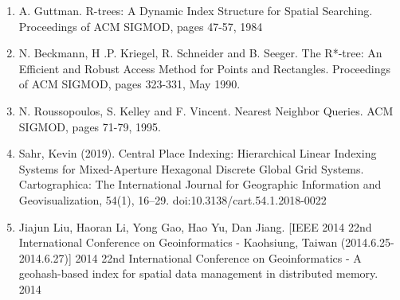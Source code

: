 %




\begin{enumerate}
    \item A. Guttman. R-trees: A Dynamic Index Structure for Spatial Searching. Proceedings of ACM SIGMOD, pages 47-57, 1984
    \item N. Beckmann, H .P. Kriegel, R. Schneider and B. Seeger. The R*-tree: An Efficient and Robust Access Method for Points and Rectangles. Proceedings of ACM SIGMOD, pages 323-331, May 1990.
    \item N. Roussopoulos, S. Kelley and F. Vincent. Nearest Neighbor Queries. ACM SIGMOD, pages 71-79, 1995.
    \item Sahr, Kevin (2019). Central Place Indexing: Hierarchical Linear Indexing Systems for Mixed-Aperture Hexagonal Discrete Global Grid Systems. Cartographica: The International Journal for Geographic Information and Geovisualization, 54(1), 16–29. doi:10.3138/cart.54.1.2018-0022
    \item  Jiajun Liu, Haoran Li, Yong Gao, Hao Yu, Dan Jiang. [IEEE 2014 22nd International Conference on Geoinformatics - Kaohsiung, Taiwan (2014.6.25-2014.6.27)] 2014 22nd International Conference on Geoinformatics - A geohash-based index for spatial data management in distributed memory. 2014
    
\end{enumerate}

